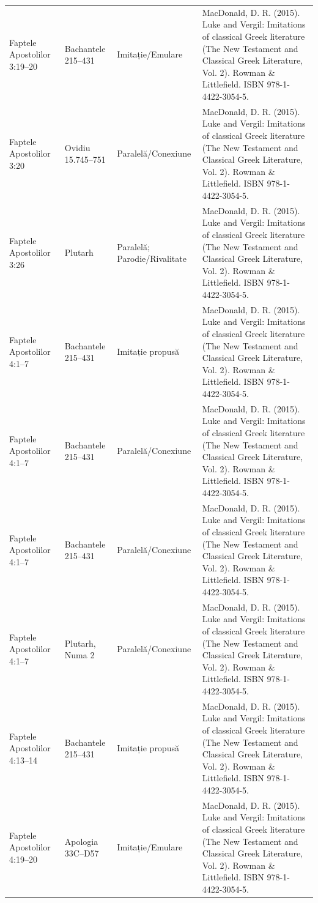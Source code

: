 \documentclass[12pt,a4paper,twoside,openany]{book}
\begin{document}
\begin{longtable}{L{1.4cm}L{1.7cm}L{3.1cm}L{8.4cm}}
Faptele Apostolilor 3:19–20 & Bachantele 215–431 & Imitație/Emulare & MacDonald, D. R. (2015). Luke and Vergil: Imitations of classical Greek literature (The New Testament and Classical Greek Literature, Vol. 2). Rowman \& Littlefield. ISBN 978-1-4422-3054-5. \\
Faptele Apostolilor 3:20 & Ovidiu 15.745–751 & Paralelă/Conexiune & MacDonald, D. R. (2015). Luke and Vergil: Imitations of classical Greek literature (The New Testament and Classical Greek Literature, Vol. 2). Rowman \& Littlefield. ISBN 978-1-4422-3054-5. \\
Faptele Apostolilor 3:26 & Plutarh & Paralelă; Parodie/Rivalitate & MacDonald, D. R. (2015). Luke and Vergil: Imitations of classical Greek literature (The New Testament and Classical Greek Literature, Vol. 2). Rowman \& Littlefield. ISBN 978-1-4422-3054-5. \\
Faptele Apostolilor 4:1–7 & Bachantele 215–431 & Imitație propusă & MacDonald, D. R. (2015). Luke and Vergil: Imitations of classical Greek literature (The New Testament and Classical Greek Literature, Vol. 2). Rowman \& Littlefield. ISBN 978-1-4422-3054-5. \\
Faptele Apostolilor 4:1–7 & Bachantele 215–431 & Paralelă/Conexiune & MacDonald, D. R. (2015). Luke and Vergil: Imitations of classical Greek literature (The New Testament and Classical Greek Literature, Vol. 2). Rowman \& Littlefield. ISBN 978-1-4422-3054-5. \\
Faptele Apostolilor 4:1–7 & Bachantele 215–431 & Paralelă/Conexiune & MacDonald, D. R. (2015). Luke and Vergil: Imitations of classical Greek literature (The New Testament and Classical Greek Literature, Vol. 2). Rowman \& Littlefield. ISBN 978-1-4422-3054-5. \\
Faptele Apostolilor 4:1–7 & Plutarh, Numa 2 & Paralelă/Conexiune & MacDonald, D. R. (2015). Luke and Vergil: Imitations of classical Greek literature (The New Testament and Classical Greek Literature, Vol. 2). Rowman \& Littlefield. ISBN 978-1-4422-3054-5. \\
Faptele Apostolilor 4:13–14 & Bachantele 215–431 & Imitație propusă & MacDonald, D. R. (2015). Luke and Vergil: Imitations of classical Greek literature (The New Testament and Classical Greek Literature, Vol. 2). Rowman \& Littlefield. ISBN 978-1-4422-3054-5. \\
Faptele Apostolilor 4:19–20 & Apologia 33C–D57 & Imitație/Emulare & MacDonald, D. R. (2015). Luke and Vergil: Imitations of classical Greek literature (The New Testament and Classical Greek Literature, Vol. 2). Rowman \& Littlefield. ISBN 978-1-4422-3054-5. \\

\end{longtable}
\end{document}
